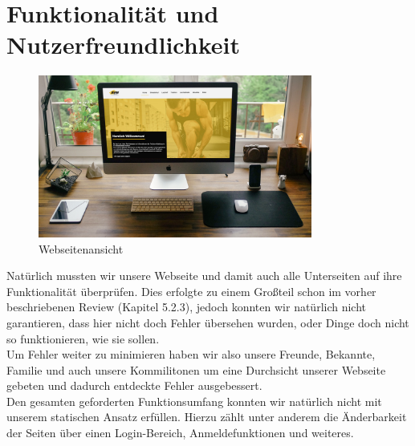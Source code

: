 \documentclass[12pt,a4paper]{article}
\begin{document}
\section{Funktionalität und Nutzerfreundlichkeit}
\begin{figure}
  \includegraphics[width=9cm]{Home_Desktop.jpg}
  \caption{Webseitenansicht}
\end{figure}
Natürlich mussten wir unsere Webseite und damit auch alle Unterseiten auf ihre Funktionalität überprüfen. Dies erfolgte zu einem Großteil schon im vorher beschriebenen Review (Kapitel 5.2.3), jedoch konnten wir natürlich nicht garantieren, dass hier nicht doch Fehler übersehen wurden, oder Dinge doch nicht so funktionieren, wie sie sollen.\\
Um Fehler weiter zu minimieren haben wir also unsere Freunde, Bekannte, Familie und auch unsere Kommilitonen um eine Durchsicht unserer Webseite gebeten und dadurch entdeckte Fehler ausgebessert.\\
Den gesamten geforderten Funktionsumfang konnten wir natürlich nicht mit unserem statischen Ansatz erfüllen. Hierzu zählt unter anderem die Änderbarkeit der Seiten über einen Login-Bereich, Anmeldefunktionen und weiteres.
\end{document}
